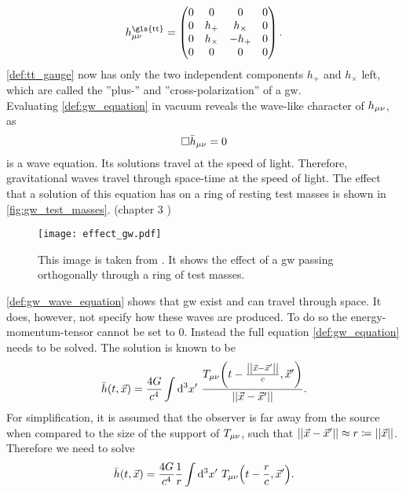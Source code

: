 \begin{equation}\label{def:tt_gauge}
h_\mn^\text{\gls{tt}}=
\begin{pmatrix}
	0 & 0         & 0        & 0\\
	0 & h_+       & h_\times & 0\\
	0 & h_\times & -h_+      & 0\\
	0 & 0         & 0        & 0\\
\end{pmatrix}.
\end{equation}
\eqref{def:tt_gauge} now has only the two independent components $h_+$ and $h_\times$ left, which are called the ''plus-'' and ''cross-polarization'' of a \gls{gw}.\medskip\\
Evaluating \eqref{def:gw_equation} in vacuum reveals the wave-like character of $h_{\mu\nu}$, as
\begin{equation}\label{def:gw_wave_equation}
\Box\bar{h}_{\mu\nu} =0
\end{equation}
is a wave equation. Its solutions travel at the speed of light. Therefore, gravitational waves travel through space-time at the speed of light. The effect that a solution of this equation has on a ring of resting test masses is shown in \autoref{fig:gw_test_masses}. (chapter 3 \cite{bachelor})\medskip\\
\begin{figure}
\centering
\texttt{[image: effect\_gw.pdf]}
\caption[Effect of GW on ring of test masses]{This image is taken from \cite{bachelor}. It shows the effect of a \gls{gw} passing orthogonally through a ring of test masses.}\label{fig:gw_test_masses}
\end{figure}
\eqref{def:gw_wave_equation} shows that \gls{gw} exist and can travel through space. It does, however, not specify how these waves are produced. To do so the energy-momentum-tensor cannot be set to $0$. Instead the full equation \eqref{def:gw_equation} needs to be solved. The solution is known to be
\begin{equation}
\bar{h}\lr{t, \vec{x}}=\frac{4 G}{c^4}\int\Diff{3}x'\ \frac{T_\mn\lr{t-\frac{\norm{\vec{x}-\vec{x}'}}{c},\vec{x}'}}{\norm{\vec{x}-\vec{x}'}}.
\end{equation}
For simplification, it is assumed that the observer is far away from the source when compared to the size of the support of $T_{\mu\nu}$, such that ${\left|\left| \vec{x}-\vec{x}' \right|\right|}\approx r\coloneqq{\left|\left| \vec{x} \right|\right|}$. Therefore we need to solve
\begin{equation}
\bar{h}\lr{t, \vec{x}}=\frac{4 G}{c^4}\frac{1}{r}\int\Diff{3}x'\ T_\mn\lr{t-\frac{r}{c},\vec{x}'}.
\end{equation}
